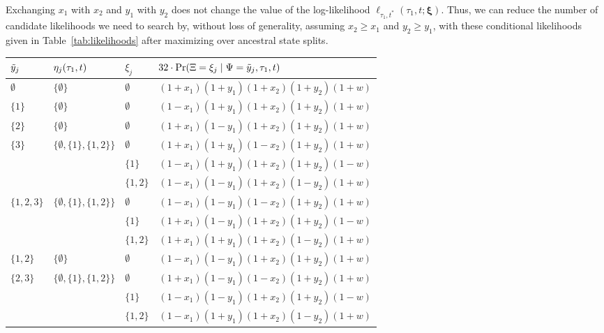 Exchanging $x_1$ with $x_2$ and $y_1$ with $y_2$ does not change the value of the log-likelihood $\ell_{\tau_1,t^*}(\tau_1, t; \boldsymbol\xi)$.
Thus, we can reduce the number of candidate likelihoods we need to search by, without loss of generality, assuming $x_2 \ge x_1$ and $y_2 \ge y_1$, with these conditional likelihoods given in Table~\ref{tab:likelihoods} after maximizing over ancestral state splits.

\begin{table}
\centering
\begin{tabular}{|lll|l|}
\hline
$\tilde{y}_j$ & $\eta_j(\tau_1, t)$ & $\xi_j$ & $32\cdot\Pr(\Xi=\xi_j \mid \Psi=\tilde{y}_j,\tau_1,t)$\\
\hline
$\emptyset$&$\{\emptyset\}$&$\emptyset$&$(1+x_1)(1+y_1)(1+x_2)(1+y_2)(1+w)$\\

$\{1\}$    &$\{\emptyset\}$&$\emptyset$&$(1-x_1)(1+y_1)(1+x_2)(1+y_2)(1+w)$\\

$\{2\}$    &$\{\emptyset\}$&$\emptyset$&$(1+x_1)(1-y_1)(1+x_2)(1+y_2)(1+w)$\\

$\{3\}$    &$\{\emptyset,\{1\},\{1,2\}\}$&$\emptyset$&$(1+x_1)(1+y_1)(1-x_2)(1+y_2)(1+w)$\\
&&$\{1\}$&$(1-x_1)(1+y_1)(1+x_2)(1+y_2)(1-w)$\\
&&$\{1,2\}$&$(1-x_1)(1-y_1)(1+x_2)(1-y_2)(1+w)$\\

$\{1,2,3\}$&$\{\emptyset,\{1\},\{1,2\}\}$&$\emptyset$&$(1-x_1)(1-y_1)(1-x_2)(1+y_2)(1+w)$\\
&&$\{1\}$&$(1+x_1)(1-y_1)(1+x_2)(1+y_2)(1-w)$\\
&&$\{1,2\}$&$(1+x_1)(1+y_1)(1+x_2)(1-y_2)(1+w)$\\

$\{1,2\}$  &$\{\emptyset\}$&$\emptyset$&$(1-x_1)(1-y_1)(1+x_2)(1+y_2)(1+w)$\\

$\{2,3\}$  &$\{\emptyset,\{1\},\{1,2\}\}$&$\emptyset$&$(1+x_1)(1-y_1)(1-x_2)(1+y_2)(1+w)$\\
&&$\{1\}$&$(1-x_1)(1-y_1)(1+x_2)(1+y_2)(1-w)$\\
&&$\{1,2\}$&$(1-x_1)(1+y_1)(1+x_2)(1-y_2)(1+w)$\\


\end{tabular}
\end{table}

